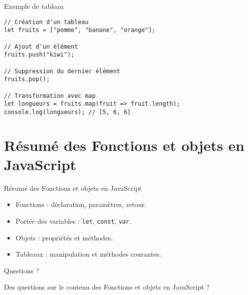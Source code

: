 \documentclass{beamer}
\begin{document}
\begin{frame}[fragile]{Exemple de tableau}
\begin{verbatim}
// Création d'un tableau
let fruits = ["pomme", "banane", "orange"];

// Ajout d'un élément
fruits.push("kiwi");

// Suppression du dernier élément
fruits.pop();

// Transformation avec map
let longueurs = fruits.map(fruit => fruit.length);
console.log(longueurs); // [5, 6, 6]
\end{verbatim}
\end{frame}

\section{Résumé des Fonctions et objets en JavaScript}
\begin{frame}{ Résumé des Fonctions et objets en JavaScript}
\begin{itemize}
    \item Fonctions : déclaration, paramètres, retour.
    \item Portée des variables : \texttt{let}, \texttt{const}, \texttt{var}.
    \item Objets : propriétés et méthodes.
    \item Tableaux : manipulation et méthodes courantes.
\end{itemize}
\end{frame}

\begin{frame}{Questions ?}
\begin{center}
\Large Des questions sur le contenu des Fonctions et objets en JavaScript ?
\end{center}
\end{frame}
\end{document}
